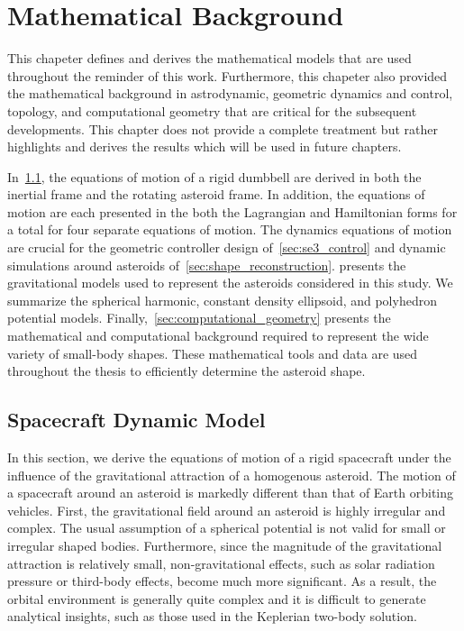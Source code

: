 
\chapter{Mathematical Background}\label{sec:mathematical_background}
This chapeter defines and derives the mathematical models that are used throughout the reminder of this work.
Furthermore, this chapeter also provided the mathematical background in astrodynamic, geometric dynamics and control, topology, and computational geometry that are critical for the subsequent developments.
This chapter does not provide a complete treatment but rather highlights and derives the results which will be used in future chapters.

In~\cref{sec:dumbbell}, the equations of motion of a rigid dumbbell are derived in both the inertial frame and the rotating asteroid frame.
In addition, the equations of motion are each presented in the both the Lagrangian and Hamiltonian forms for a total for four separate equations of motion.
The dynamics equations of motion are crucial for the geometric controller design of~\cref{sec:se3_control} and dynamic simulations around asteroids of~\cref{sec:shape_reconstruction}.
 presents the gravitational models used to represent the asteroids considered in this study. 
We summarize the spherical harmonic, constant density ellipsoid, and polyhedron potential models.
Finally,~\cref{sec:computational_geometry} presents the mathematical and computational background required to represent the wide variety of small-body shapes.
These mathematical tools and data are used throughout the thesis to efficiently determine the asteroid shape.

\section{Spacecraft Dynamic Model}\label{sec:dumbbell}

In this section, we derive the equations of motion of a rigid spacecraft under the influence of the gravitational attraction of a homogenous asteroid.
The motion of a spacecraft around an asteroid is markedly different than that of Earth orbiting vehicles.
First, the gravitational field around an asteroid is highly irregular and complex. 
The usual assumption of a spherical potential is not valid for small or irregular shaped bodies.
Furthermore, since the magnitude of the gravitational attraction is relatively small, non-gravitational effects, such as solar radiation pressure or third-body effects, become much more significant.
As a result, the orbital environment is generally quite complex and it is difficult to generate analytical insights, such as those used in the Keplerian two-body solution.

